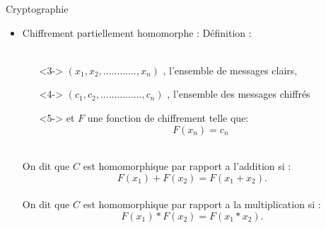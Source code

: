 \documentclass{beamer}
\begin{document}
  \begin{frame}{Cryptographie}

    \begin{itemize}
    \item<1-> {
      Chiffrement partiellement homomorphe : Définition :\\
       \\

     \begin{itemize}[label={}]
           \item[]<3-> {
             $(x_1, x_2, ............, x_n)$ , l'ensemble de messages clairs, 
           }
           \item[]<4-> {  
             $(c_1, c_2, ..............., c_n)$ , l'ensemble des messages chiffrés
           }
           \item[]<5-> {
        et $ F$ une fonction de chiffrement telle que:\\
        $$F(x_n) = c_n$$
           }\\
     \end{itemize}

              {On dit que $C$ est homomorphique par rapport a l'addition si : \\
               $$F(x_1) + F(x_2) = F(x_1 + x_2).$$
                           }\\
       {On dit que $C$ est homomorphique par rapport a la multiplication si : \\
 $$F(x_1) * F(x_2) = F(x_1 * x_2).$$}
          }   
    
  \end{itemize}
\end{frame}

\end{document}
